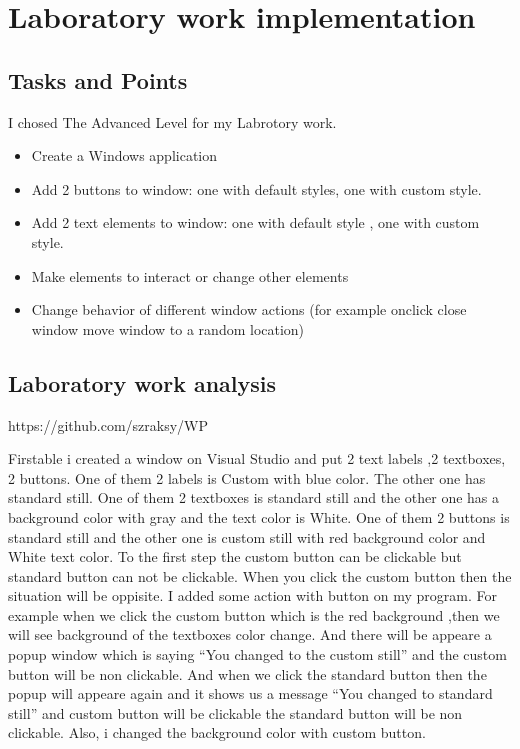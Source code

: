 \section{Laboratory work implementation}

\subsection{Tasks and Points}
I chosed The Advanced Level for my Labrotory work.
\begin{itemize}
\item Create a Windows application
\item Add 2 buttons to window: one with default styles, one with custom style.
\item Add 2 text elements to window: one with default style , one with custom style.
\item Make elements to interact or change other elements
\item Change behavior of different window actions (for example onclick close window move window to a random location)
\end{itemize}
\subsection{Laboratory work analysis}

https://github.com/szraksy/WP

Firstable i created a window on Visual Studio and put 2 text labels ,2
textboxes, 2 buttons. One of them 2 labels is Custom with blue color. The
other one has standard still.
One of them 2 textboxes is standard still and the other one has a
background color with gray and the text color is White.
One of them 2 buttons is standard still and the other one is custom still
with red background color and White text color.
To the first step the custom button can be clickable but standard button
can not be clickable. When you click the custom button then the situation
will be oppisite.
I added some action with button on my program. For example when we
click the custom button which is the red background ,then we will see
background of the textboxes color change. And there will be appeare a
popup window which is saying “You changed to the custom still” and the
custom button will be non clickable.
And when we click the standard button then the popup will appeare again
and it shows us a message “You changed to standard still” and custom
button will be clickable the standard button will be non clickable.
Also, i changed the background color with custom button.


